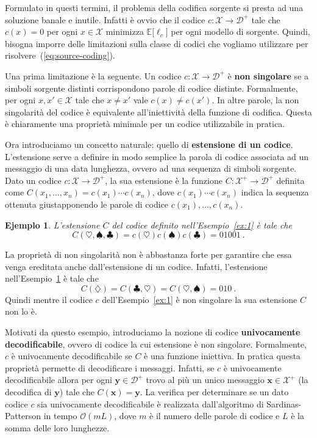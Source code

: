 \documentclass[11pt]{article}
\newtheorem{example}[theorem]{Ejemplo}
\newcommand{\bx}{ \boldsymbol{x} }
\newcommand{\by}{ \boldsymbol{y} }
\newcommand{\scD}{\mathcal{D}}
\newcommand{\scX}{\mathcal{X}}
\newcommand{\field}[1]{\mathbb{#1}}
\newcommand{\E}{\field{E}}
\begin{document}
Formulato in questi termini, il problema della codifica sorgente si presta ad una soluzione banale e inutile. Infatti è ovvio che il codice $c : \scX\to\scD^+$ tale che $c(x)=0$ per ogni $x\in\scX$ minimizza $\E\bigl[\ell_c\bigr]$ per ogni modello di sorgente. Quindi, bisogna imporre delle limitazioni sulla classe di codici che vogliamo utilizzare per risolvere~(\ref{eq:source-coding}).

Una prima limitazione è la seguente. Un codice $c : \scX\to\scD^+$ è \textbf{non singolare} se a simboli sorgente distinti corrispondono parole di codice distinte. Formalmente, per ogni $x,x'\in\scX$ tale che $x \neq x'$ vale $c(x) \neq c(x')$. In altre parole, la non singolarità del codice è equivalente all'iniettività della funzione di codifica. Questa è chiaramente una proprietà minimale per un codice utilizzabile in pratica.

Ora introduciamo un concetto naturale: quello di \textbf{estensione di un codice}. L'estensione serve a definire in modo semplice la parola di codice associata ad un messaggio di una data lunghezza, ovvero ad una sequenza di simboli sorgente. Dato un codice $c : \scX\to\scD^+$, la sua estensione è la funzione $C : \scX^+\to\scD^+$ definita come
$
    C(x_1,\dots,x_n) = c(x_1) \cdots c(x_n)
$, dove $c(x_1) \cdots c(x_n)$ indica la sequenza ottenuta giustapponendo le parole di codice $c(x_1),\dots,c(x_n)$.
%
\begin{example}
\label{ex:2}
L'estensione $C$ del codice definito nell'Esempio~\ref{ex:1} è tale che
\[
    C(\heartsuit,\spadesuit,\clubsuit) = c(\heartsuit)c(\spadesuit)c(\clubsuit) = 01001~.
\]
\end{example}
%
La proprietà di non singolarità non è abbastanza forte per garantire che essa venga ereditata anche dall'estensione di un codice. Infatti, l'estensione nell'Esempio~\ref{ex:2} è tale che
\[
    C(\diamondsuit) = C(\clubsuit,\heartsuit) = C(\heartsuit,\spadesuit) = 010~.
\]
Quindi mentre il codice $c$ dell'Esempio~\ref{ex:1} è non singolare la sua estensione $C$ non lo è.

Motivati da questo esempio, introduciamo la nozione di codice \textbf{univocamente decodificabile}, ovvero di codice la cui estensione è non singolare. Formalmente, $c$ è univocamente decodificabile se $C$ è una funzione iniettiva. In pratica questa proprietà permette di decodificare i messaggi. Infatti, se $c$ è univocamente decodificabile allora per ogni $\by\in\scD^+$ trovo al più un unico messaggio $\bx\in\scX^+$ (la decodifica di $\by$) tale che $C(\bx) = \by$. La verifica per determinare se un dato codice $c$ sia univocamente decodificabile è realizzata dall'algoritmo di Sardinas-Patterson in tempo $\mathcal{O}(mL)$, dove $m$ è il numero delle parole di codice e $L$ è la somma delle loro lunghezze.
\end{document}

